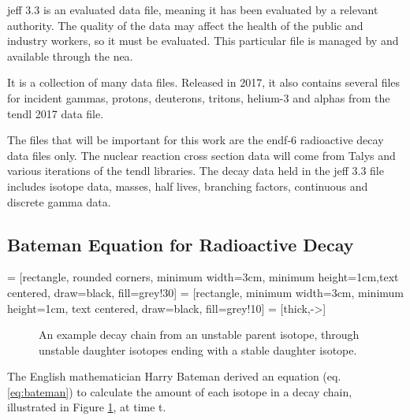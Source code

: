 \acrshort{jeff} 3.3 is an evaluated data file\cite{jeff311}, meaning it has been evaluated by a relevant authority.  The quality of the data may affect the health of the public and industry workers, so it must be evaluated.  This particular file is managed by and available through the \acrfull{nea}.

It is a collection of many data files.  Released in 2017, it also contains several files for incident gammas, protons, deuterons, tritons, helium-3 and alphas from the \acrshort{tendl} 2017 data file.

The files that will be important for this work are the \acrshort{endf}-6 radioactive decay data files only.  The nuclear reaction cross section data will come from Talys and various iterations of the \acrshort{tendl} libraries.  The decay data held in the \acrshort{jeff} 3.3 file includes isotope data, masses, half lives, branching factors, continuous and discrete gamma data.


\subsection{Bateman Equation for Radioactive Decay}

 = [rectangle, rounded corners, minimum width=3cm, minimum height=1cm,text centered, draw=black, fill=grey!30]
 = [rectangle, minimum width=3cm, minimum height=1cm, text centered, draw=black, fill=grey!10]
 = [thick,->]

\begin{figure}[!h]
\centering
{}
\caption{An example decay chain from an unstable parent isotope, through unstable daughter isotopes ending with a stable daughter isotope.}
\label{fig:decaychain}
\end{figure}

The English mathematician Harry Bateman derived an equation (eq. \ref{eq:bateman}) to calculate the amount of each isotope in a decay chain, illustrated in Figure \ref{fig:decaychain}, at time t.

